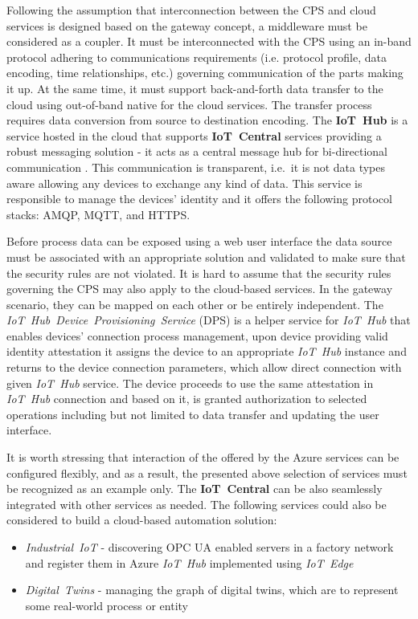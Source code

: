 \documentclass{article}
\begin{document}
Following the assumption that interconnection between the CPS and cloud services is designed based on the gateway concept, a middleware must be considered as a coupler. It must be interconnected with the CPS using an in-band protocol adhering to communications requirements (i.e. protocol profile, data encoding, time relationships, etc.) governing communication of the parts making it up. At the same time, it must support back-and-forth data transfer to the cloud using out-of-band native for the cloud services. The transfer process requires data conversion from source to destination encoding. The \textbf{IoT\ Hub} is a service hosted in the cloud that supports \textbf{IoT\ Central} services providing a robust messaging solution - it acts as a central message hub for bi-directional communication \cite{MicrosoftAzureIoTPlatform}. This communication is transparent, i.e.~it is not data types aware allowing any devices to exchange any kind of data. This service is responsible to manage the devices' identity and it offers the following protocol stacks: AMQP, MQTT, and HTTPS.

Before process data can be exposed using a web user interface the data source must be associated with an appropriate solution and validated to make sure that the security rules are not violated. It is hard to assume that the security rules governing the CPS may also apply to the cloud-based services. In the gateway scenario, they can be mapped on each other or be entirely independent. The \emph{IoT\ Hub\ Device\ Provisioning\ Service} (DPS) is a helper service for \emph{IoT\ Hub} that enables devices' connection process management, upon device providing valid identity attestation it assigns the device to an appropriate \emph{IoT\ Hub} instance and returns to the device connection parameters, which allow direct connection with given \emph{IoT\ Hub} service. The device proceeds to use the same attestation in \emph{IoT\ Hub} connection and based on it, is granted authorization to selected operations including but not limited to data transfer and updating the user interface.

It is worth stressing that interaction of the offered by the Azure services can be configured flexibly, and as a result, the presented above selection of services must be recognized as an example only. The \textbf{IoT\ Central} can be also seamlessly integrated with other services as needed. The following services could also be considered to build a cloud-based automation solution:

\begin{itemize}
      \item \emph{Industrial\ IoT} - discovering OPC UA enabled servers in a factory network and register them in Azure \emph{IoT\ Hub} implemented using \emph{IoT\ Edge}
      \item \emph{Digital\ Twins} - managing the graph of digital twins, which are to represent some real-world process or entity
\end{itemize}
\end{document}
